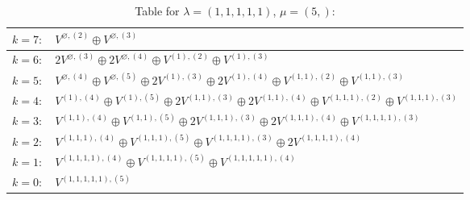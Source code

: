 \documentclass[a4paper,12pt]{article}
\begin{document}
\renewcommand{\arraystretch}{1.6} 
\begin{table}[H]
\centering
\caption{Table for $\lambda = (1, 1, 1, 1, 1)$, $\mu = (5,)$:}
\begin{tabular}{|>{\centering\arraybackslash}p{15cm}|}
\hline
 $k = 7: \quad V^{\varnothing, (2)} \oplus V^{\varnothing, (3)} $ \\ \hline
 $k = 6: \quad 2 V^{\varnothing, (3)} \oplus 2 V^{\varnothing, (4)} \oplus V^{(1), (2)} \oplus V^{(1), (3)} $ \\ \hline
 $k = 5: \quad V^{\varnothing, (4)} \oplus V^{\varnothing, (5)} \oplus 2 V^{(1), (3)} \oplus 2 V^{(1), (4)} \oplus V^{(1, 1), (2)} \oplus V^{(1, 1), (3)} $ \\ \hline
 $k = 4: \quad V^{(1), (4)} \oplus V^{(1), (5)} \oplus 2 V^{(1, 1), (3)} \oplus 2 V^{(1, 1), (4)} \oplus V^{(1, 1, 1), (2)} \oplus V^{(1, 1, 1), (3)} $ \\ \hline
 $k = 3: \quad V^{(1, 1), (4)} \oplus V^{(1, 1), (5)} \oplus 2 V^{(1, 1, 1), (3)} \oplus 2 V^{(1, 1, 1), (4)} \oplus V^{(1, 1, 1, 1), (3)} $ \\ \hline
 $k = 2: \quad V^{(1, 1, 1), (4)} \oplus V^{(1, 1, 1), (5)} \oplus V^{(1, 1, 1, 1), (3)} \oplus 2 V^{(1, 1, 1, 1), (4)} $ \\ \hline
 $k = 1: \quad V^{(1, 1, 1, 1), (4)} \oplus V^{(1, 1, 1, 1), (5)} \oplus V^{(1, 1, 1, 1, 1), (4)} $ \\ \hline
 $k = 0: \quad V^{(1, 1, 1, 1, 1), (5)} $ \\ \hline
\end{tabular}
\end{table}
\end{document}
